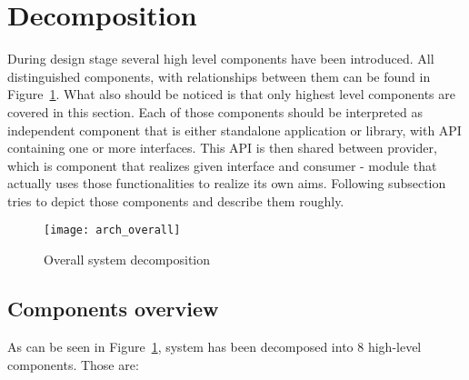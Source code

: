 %


\section{Decomposition}
\label{sec:arch_decomposition}

During design stage several high level components have been introduced. All distinguished components, with
relationships between them can be found in Figure~\ref{fig:arch_overall}. What also should be noticed is that
only highest level components are covered in this section. Each of those components should be interpreted as
independent component that is either standalone application or library, with API containing one or more
interfaces. This API is then shared between provider, which is component that realizes given interface and consumer -
module that actually uses those functionalities to realize its own aims.
Following subsection tries to depict those components and describe them roughly. 

\begin{figure}[ht]
  \centering
  \texttt{[image: arch\_overall]}
  \caption{Overall system decomposition}
  \label{fig:arch_overall}
\end{figure}

\subsection{Components overview}
 
As can be seen in Figure~\ref{fig:arch_overall}, system has been decomposed into 8 high-level components. Those are:

